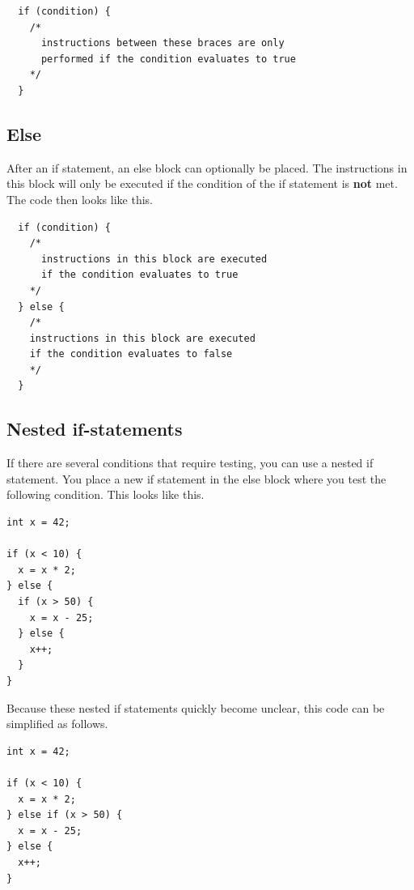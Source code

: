 \documentclass[11pt,fleqn]{book} %
\begin{document}
\begin{definition}[If]
	\phantom{ }
	\begin{verbatim}
  if (condition) {
    /*
      instructions between these braces are only
      performed if the condition evaluates to true
    */
  }
	\end{verbatim}
	\vspace{0cm}
\end{definition}

\pagebreak

\subsection{Else}
After an if statement, an else block can optionally be placed. The instructions in this block will only be executed if the condition of the if statement is \textbf{not} met. The code then looks like this.

\begin{definition}
	\phantom{ }
	\begin{verbatim}
  if (condition) {
    /*
      instructions in this block are executed
      if the condition evaluates to true
    */
  } else {
    /*
    instructions in this block are executed
    if the condition evaluates to false
    */
  }
	\end{verbatim}
\end{definition}

\subsection{Nested if-statements}
If there are several conditions that require testing, you can use a nested if statement. You place a new if statement in the else block where you test the following condition. This looks like this.

\begin{example}
	\phantom{ }
	\begin{verbatim}
int x = 42;

if (x < 10) {
  x = x * 2;
} else {
  if (x > 50) {
    x = x - 25;
  } else {
    x++;
  }
}
	\end{verbatim}
\end{example}

\noindent
Because these nested if statements quickly become unclear, this code can be simplified as follows.

\begin{example}[Else-if]
	\phantom{ }
	\begin{verbatim}
int x = 42;

if (x < 10) {
  x = x * 2;
} else if (x > 50) {
  x = x - 25;
} else {
  x++;
}
	\end{verbatim}
\end{example}
\end{document}
